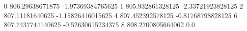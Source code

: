 0 806.29638671875 -1.97369384765625
1 805.932861328125 -2.33721923828125
2 807.11181640625 -1.15826416015625
4 807.452392578125 -0.81768798828125
6 807.7437744140625 -0.52630615234375
8 808.2700805664062 0.0

